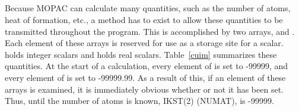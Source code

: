 \subsection*{}
Because MOPAC can calculate many quantities, such as the number of atoms, heat
of formation, etc., a method has to exist to allow these quantities to be
transmitted throughout the program. This is accomplished by two arrays, 
and .  Each element of these
arrays is reserved for use as a storage site for a scalar.   holds
integer scalars and  holds real scalars.  Table~\ref{cuim}
summarizes these quantities.   At the start of a calculation, every element of
 is set to -99999, and every element of  is set to
-99999.99. As a result of this, if an element of these arrays is examined, it
is immediately obvious whether or not it has been set.  Thus, until the number
of atoms is known, IKST(2) (NUMAT), is -99999.

